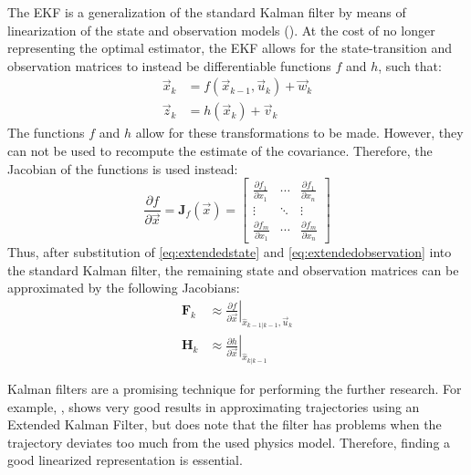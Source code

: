 The EKF is a generalization of the standard Kalman filter by means of linearization of the state and observation models (\cite{extendedkalman}). At the cost of no longer representing the optimal estimator, the EKF allows for the state-transition and observation matrices to instead be differentiable functions $f$ and $h$, such that:
\begin{align}
    \vec{x}_k &= f(\vec{x}_{k-1}, \vec{u}_k) + \vec{w}_k
    \label{eq:extendedstate} \\
    \vec{z}_k &= h(\vec{x}_k) + \vec{v}_k
    \label{eq:extendedobservation}
\end{align}
The functions $f$ and $h$ allow for these transformations to be made. However, they can not be used to recompute the estimate of the covariance. Therefore, the Jacobian of the functions is used instead:
\begin{equation}
    \frac{\partial f}{\partial \vec{x}} = \mathbf{J}_f(\vec{x}) = \begin{bmatrix} \frac{\partial f_1}{\partial x_1} & \cdots & \frac{\partial f_1}{\partial x_n} \\
    \vdots & \ddots & \vdots \\
    \frac{\partial f_m}{\partial x_1} & \cdots & \frac{\partial f_m}{\partial x_n} \end{bmatrix}
    \label{eq:jacobian}
\end{equation}
Thus, after substitution of \autoref{eq:extendedstate} and \autoref{eq:extendedobservation} into the standard Kalman filter, the remaining state and observation matrices can be approximated by the following Jacobians:
\begin{align}
    \mathbf{F}_k &\approx \left. \frac{\partial f}{\partial \vec{x}} \right|_{\hat{x}_{k-1|k-1}, \vec{u}_k} \\
    \mathbf{H}_k &\approx \left. \frac{\partial h}{\partial \vec{x}} \right|_{\hat{x}_{k|k-1}}
\end{align}

Kalman filters are a promising technique for performing the further research. For example, \cite{trajectorythesis}, shows very good results in approximating trajectories using an Extended Kalman Filter, but does note that the filter has problems when the trajectory deviates too much from the used physics model. Therefore, finding a good linearized representation is essential.

